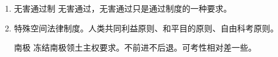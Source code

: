 \begin{enumerate}
\begin{kk}{群岛水域}
          
          \begin{enumerate}
            \item 岛屿封闭线以外，群岛基线以内，内水和领海之间，主轮廓，不能隔断其他国家领海 \hz 专属经济区。
            \item 群岛国领水 = 内水 + 领海。完全主权，。
            \item 无害通过制。船无害通过、飞机经许可走空中通道（是权利）。。
          \end{enumerate}
        \end{kk}

        \begin{kk}{国际海峡}
          \begin{enumerate}
            \item 两端连接的是公海 \hz 专属经济区。
            \item 通行制度。最最重要。
                  \begin{enumerate}
                    \item 陆地之间的海峡 \yjt 过境通行制。飞机、船舶不经许可、不打招呼、无害通过。
                    \item 一国大陆和该国岛屿构成的国际海峡且该岛屿向海一面有方便的航道 \yjt （船）无害通过制。
                    \item 自由通行制。如果中间航道够宽，可走走停停。
                    \item 沿岸国可以指定航道、规定分道分航（是权利） + 国际海事组织同意，危险情况公布。
                  \end{enumerate}
          \end{enumerate}
        \end{kk}
  \item 无害通过制 \bdy 无害通过，无害通过只是通过制度的一种要求。
  \item 特殊空间法律制度。人类共同利益原则、和平目的原则、自由科考原则。
        \begin{kk}{南极}
          冻结南极领土主权要求。不前进不后退。可考性相对差一些。
        \end{kk}


\end{enumerate}
